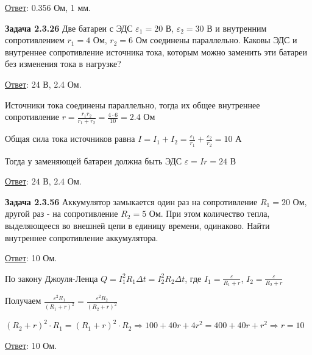 \documentclass[12pt]{article}
\begin{document}
\bigvspace

\underline{Ответ}: 0.356 Ом, 1 мм.

\begin{tcolorbox}
    \textbf{Задача 2.3.26} Две батареи с ЭДС $\varepsilon_1 = 20$ В, $\varepsilon_2 = 30$ В и внутренним
    сопротивлением $r_1 = 4$ Ом, $r_2 = 6$ Ом соединены параллельно. Каковы
    ЭДС и внутреннее сопротивление источника тока, которым можно заменить 
    эти батареи без изменения тока в нагрузке?

    \begin{UpsideDown}
        \footnotesize
        \underline{Ответ}: 24 В, 2.4 Ом.
    \end{UpsideDown}
\end{tcolorbox}

Источники тока соединены параллельно, тогда их общее внутреннее сопротивление $r = \frac{r_1 r_2}{r_1 + r_2} = \frac{4 \cdot 6}{10}= 2.4$ Ом

Общая сила тока источников равна $I = I_1 + I_2 = \frac{\varepsilon_1}{r_1} + \frac{\varepsilon_2}{r_2} = 10$ А

Тогда у заменяющей батареи должна быть ЭДС $\varepsilon = Ir = 24$ В

\bigvspace

\underline{Ответ}: $24$ В, $2.4$ Ом.


\begin{tcolorbox}
    \textbf{Задача 2.3.56} Аккумулятор замыкается один раз на сопротивление $R_1 = 20$ Ом, 
    другой раз - на сопротивление $R_2 = 5$ Ом. При этом количество
    тепла, выделяющееся во внешней цепи в единицу времени, одинаково.
    Найти внутреннее сопротивление аккумулятора.
    
    \begin{UpsideDown}
        \footnotesize
        \underline{Ответ}: 10 Ом.
    \end{UpsideDown}
\end{tcolorbox}

По закону Джоуля-Ленца $Q = I_1^2 R_1 \Delta t = I_2^2 R_2 \Delta t$, где $I_1 = \frac{\varepsilon}{R_1 + r}$, $I_2 = \frac{\varepsilon}{R_2 + r}$

Получаем $\frac{\varepsilon^2 R_1}{(R_1 + r)^2} = \frac{\varepsilon^2 R_2}{(R_2 + r)^2}$

$(R_2 + r)^2 \cdot R_1 = (R_1 + r)^2 \cdot R_2 \Longrightarrow 100 + 40r + 4r^2 = 400 + 40r + r^2 \Longrightarrow r = 10$

\bigvspace

\underline{Ответ}: 10 Ом.

\end{document}
